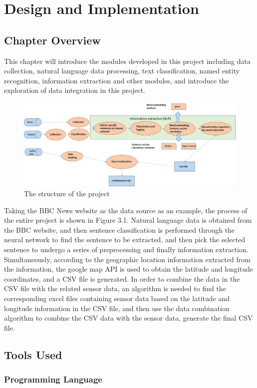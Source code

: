 \chapter{Design and Implementation}
\section{Chapter Overview}
This chapter will introduce the modules developed in this project including data collection, natural language data processing, text classification, named entity recognition, information extraction and other modules, and introduce the exploration of data integration in this project.
\begin{figure}[H]
\centering 
\includegraphics[width=1\textwidth]{data-flow.png}
\caption{The structure of the project}
\end{figure}
Taking the BBC News website as the data source as an example, the process of the entire project is shown in Figure 3.1. Natural language data is obtained from the BBC website, and then sentence classification is performed through the neural network to find the sentence to be extracted, and then pick the selected sentence to undergo a series of preprocessing and finally information extraction. Simultaneously, according to the geographic location information extracted from the information, the google map API is used to obtain the latitude and longitude coordinates, and a CSV file is generated. In order to combine the data in the CSV file with the related sensor data, an algorithm is needed to find the corresponding excel files containing sensor data based on the latitude and longitude information in the CSV file, and then use the data combination algorithm to combine the CSV data with the sensor data, generate the final CSV file.
\section{Tools Used}
\subsection{Programming Language}
